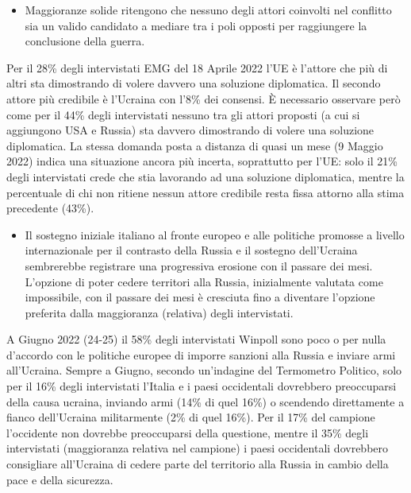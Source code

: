 \documentclass[
  openany]{book}
\providecommand{\tightlist}{%
  \setlength{\itemsep}{0pt}\setlength{\parskip}{0pt}}
\begin{document}
\begin{itemize}
\tightlist
\item
  Maggioranze solide ritengono che nessuno degli attori coinvolti nel conflitto sia un valido candidato a mediare tra i poli opposti per raggiungere la conclusione della guerra.
\end{itemize}

Per il 28\% degli intervistati EMG del 18 Aprile 2022 l'UE è l'attore che più di altri sta dimostrando di volere davvero una soluzione diplomatica. Il secondo attore più credibile è l'Ucraina con l'8\% dei consensi. È necessario osservare però come per il 44\% degli intervistati nessuno tra gli attori proposti (a cui si aggiungono USA e Russia) sta davvero dimostrando di volere una soluzione diplomatica. La stessa domanda posta a distanza di quasi un mese (9 Maggio 2022) indica una situazione ancora più incerta, soprattutto per l'UE: solo il 21\% degli intervistati crede che stia lavorando ad una soluzione diplomatica, mentre la percentuale di chi non ritiene nessun attore credibile resta fissa attorno alla stima precedente (43\%).

\begin{itemize}
\tightlist
\item
  Il sostegno iniziale italiano al fronte europeo e alle politiche promosse a livello internazionale per il contrasto della Russia e il sostegno dell'Ucraina sembrerebbe registrare una progressiva erosione con il passare dei mesi. L'opzione di poter cedere territori alla Russia, inizialmente valutata come impossibile, con il passare dei mesi è cresciuta fino a diventare l'opzione preferita dalla maggioranza (relativa) degli intervistati.
\end{itemize}

A Giugno 2022 (24-25) il 58\% degli intervistati Winpoll sono poco o per nulla d'accordo con le politiche europee di imporre sanzioni alla Russia e inviare armi all'Ucraina. Sempre a Giugno, secondo un'indagine del Termometro Politico, solo per il 16\% degli intervistati l'Italia e i paesi occidentali dovrebbero preoccuparsi della causa ucraina, inviando armi (14\% di quel 16\%) o scendendo direttamente a fianco dell'Ucraina militarmente (2\% di quel 16\%). Per il 17\% del campione l'occidente non dovrebbe preoccuparsi della questione, mentre il 35\% degli intervistati (maggioranza relativa nel campione) i paesi occidentali dovrebbero consigliare all'Ucraina di cedere parte del territorio alla Russia in cambio della pace e della sicurezza.
\end{document}
